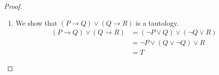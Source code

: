 \documentclass[12pt]{amsart}
\theoremstyle{definition}
\theoremstyle{remark}
\begin{document}
\begin{proof}
\begin{enumerate}
\begin{equation*}
		= [P \vee (P \wedge Q)] \rightarrow R \\
		= P \rightarrow R
	\end{equation*}
	Now we are left with
	\begin{equation*}
		(P \rightarrow R) \wedge [P \rightarrow (Q \vee R)] \wedge [(P \wedge R) \rightarrow Q]
		\wedge [Q \rightarrow (P \vee R)].
	\end{equation*}
	Next we use the fact that $(P \rightarrow Q) \wedge (P \rightarrow R)$ and $P \rightarrow (Q \wedge R)$ are equivalent with the first two terms.
	\begin{equation*}
		(P \rightarrow R) \wedge [P \rightarrow (Q \vee R)]
		= P \rightarrow [R \wedge (Q \vee R)]
		= P \rightarrow R
	\end{equation*}
	Now we are left with
	\begin{equation*}
		(P \rightarrow R) \wedge [(P \wedge R) \rightarrow Q] \wedge [Q \rightarrow (P \vee R)].
	\end{equation*}
	At this stage, we use the definition of the conditional connective.
	\begin{align*}
		& (P \rightarrow R) \wedge [(P \wedge R) \rightarrow Q] \wedge [Q \rightarrow (P \vee R)] \\
		&= (\neg P \vee R) \wedge (\neg P \vee Q \vee \neg R) \wedge (P \vee \neg Q \vee R)
	\end{align*}
	Note that $\neg P \vee R$ is equivalent to $(\neg P \vee R) \vee (Q \wedge \neg Q)$,
	which in turn is equivalent to $(\neg P \vee Q \vee R) \wedge (\neg P \vee \neg Q \vee R)$.
	\begin{align*}
		& (\neg P \vee R) \wedge (\neg P \vee Q \vee \neg R) \wedge (P \vee \neg Q \vee R) \\
		&= (\neg P \vee Q \vee R) \wedge (\neg P \vee \neg Q \vee R)
			\wedge (\neg P \vee Q \vee \neg R) \wedge (P \vee \neg Q \vee R) \\
		&= [(\neg P \vee Q \vee R) \wedge (\neg P \vee Q \vee \neg R)]
			\wedge [(\neg P \vee \neg Q \vee R) \wedge (P \vee \neg Q \vee R)] \\
		&= [(\neg P \vee Q) \vee (R \wedge \neg R)] 
			\wedge [(\neg P \wedge P) \vee (\neg Q \vee R)] \\
		&= (\neg P \vee Q) \wedge (\neg Q \vee R) \\
		&= (P \rightarrow Q) \wedge (Q \rightarrow R)
	\end{align*}
	This completes the proof that $(P \rightarrow Q) \wedge (Q \rightarrow R)$ is equivalent to $(P \rightarrow R) \wedge [(P \leftrightarrow Q) \vee (R \leftrightarrow Q)]$.
	
	\item We show that $(P \rightarrow Q) \vee (Q \rightarrow R)$ is a tautology.
	\begin{align*}
		(P \rightarrow Q) \vee (Q \rightarrow R)
		&= (\neg P \vee Q) \vee (\neg Q \vee R) \\
		&= \neg P \vee (Q \vee \neg Q) \vee R \\
		&= T
	\end{align*}
\end{enumerate}
\end{proof}
\end{document}
